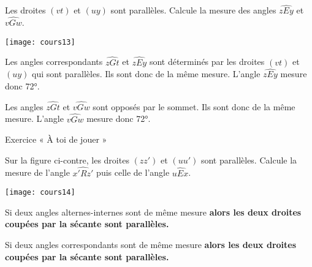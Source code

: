 \begin{exemple*1}
Les droites $(vt)$ et $(uy)$ sont parallèles. Calcule la mesure des angles $\widehat{zEy}$ et $\widehat{vGw}$.

\begin{center}
    \texttt{[image: cours13]}
\end{center}

\correction
Les angles correspondants $\widehat{zGt}$ et $\widehat{zEy}$ sont déterminés par les droites $(vt)$ et $(uy)$ qui sont parallèles. Ils sont donc de la même mesure. L'angle $\widehat{zEy}$ mesure donc 72°.

\vspace{.5em}

Les angles $\widehat{zGt}$ et $\widehat{vGw}$ sont opposés par le sommet. Ils sont donc de la même mesure. L'angle $\widehat{vGw}$ mesure donc 72°.
\end{exemple*1}

\vspace{1em}

Exercice « À toi de jouer »

Sur la figure ci-contre, les droites $(zz')$ et $(uu')$ sont parallèles. Calcule la mesure de l'angle $\widehat{x'Rz'}$ puis celle de l'angle $\widehat{uEx}$.

\begin{center}
    \texttt{[image: cours14]}
\end{center}


\begin{aconnaitre}
Si deux angles alternes-internes sont de même mesure \textbf{alors les deux droites coupées par la sécante sont parallèles.}

\vspace{.5em}

Si deux angles correspondants sont de même mesure \textbf{alors les deux droites coupées par la sécante sont parallèles.}
\end{aconnaitre}


